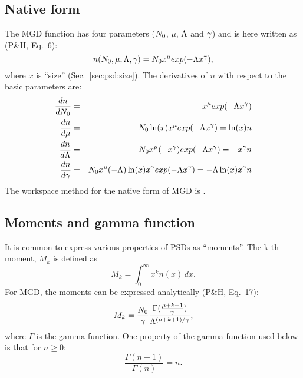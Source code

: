 \subsection{Native form}
\label{sec:mgd_native}
%
The MGD function has four parameters ($N_0$, $\mu$, $\Lambda$ and $\gamma$) and is
here written as (P\&H, Eq.~6):
\begin{equation}
  n(N_0,\mu,\Lambda,\gamma) = N_0 x^\mu exp(-\Lambda x^\gamma),
\end{equation}
where $x$ is ``size'' (Sec.~\ref{sec:psd:size}). The derivatives of $n$ with respect to
the basic parameters are:
\begin{eqnarray}
  \frac{dn}{dN_0} &=& x^\mu exp(-\Lambda x^\gamma) \label{eq:dndno} \\
  \frac{dn}{d\mu} &=& N_0 \ln(x) x^\mu exp(-\Lambda x^\gamma) = \ln(x)n \label{eq:dndmu}\\
  \frac{dn}{d\Lambda} &=& N_0 x^\mu (-x^\gamma) exp(-\Lambda x^\gamma) = -x^\gamma n \label{eq:dndla}\\
  \frac{dn}{d\gamma} &=& N_0 x^\mu (-\Lambda)\ln(x) x^\gamma exp(-\Lambda x^\gamma) =
                      -\Lambda\ln(x) x^\gamma n \label{eq:dndga}
\end{eqnarray}
The workspace method for the native form of MGD is .


\subsection{Moments and gamma function}
%
It is common to express various properties of PSDs as ``moments''. The k-th
moment, $M_k$ is defined as
\begin{equation}
  M_k = \int_0^\infty x^k n(x)\, dx.
\end{equation}
For MGD, the moments can be expressed analytically (P\&H, Eq.~17):
\begin{equation}
  M_k = \frac{N_0}{\gamma}\frac{\Gamma(\frac{\mu+k+1}{\gamma})}{\Lambda^{(\mu+k+1)/\gamma}},
\end{equation}
where $\Gamma$ is the gamma function. One property of the gamma function used
below is that for $n\geq0$:
\begin{equation}
  \frac{\Gamma(n+1)}{\Gamma(n)} = n.
\end{equation}




